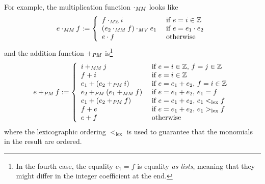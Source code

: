 \documentclass[runningheads]{llncs}
\newcommand{\Z}{{\mathbb Z}}
\begin{document}
For example, the multiplication function $\cdot_{\it MM}$ looks like
\[
e\cdot_{\it MM}f := \left\{
\begin{array}{ll}
 f\cdot_{\it M\Z}i & \mbox{ if $e=i\in\Z$}\\
 (e_2\cdot_{\it MM}f)\cdot_{\it MV}e_1 & \mbox{ if $e=e_1\cdot e_2$}\\
 e\cdot f & \mbox{ otherwise}
\end{array}\right.
\]
\noindent and the addition function $+_{\it PM}$ is\footnote{In the fourth
case, the equality $e_1=f$ is equality \emph{as lists}, meaning that
they might differ in the integer coefficient at the end.}
\[
e+_{\it PM}f := \left\{
\begin{array}{ll}
 i+_{\it MM} j & \mbox{ if $e=i\in\Z$, $f=j\in\Z$} \\
 f+i & \mbox{ if $e=i\in\Z$} \\
 e_1+(e_2+_{\it PM} i) & \mbox{ if $e=e_1+e_2$, $f=i\in\Z$} \\
 e_2+_{\it PM}(e_1+_{\it MM} f) & \mbox{ if $e=e_1+e_2$, $e_1=f$} \\
 e_1+(e_2+_{\it PM} f) & \mbox{ if $e=e_1+e_2$, $e_1<_{\mathrm{lex}}f$} \\
 f+e & \mbox{ if $e=e_1+e_2$, $e_1>_{\mathrm{lex}}f$} \\
 e+f & \mbox{ otherwise}
\end{array}\right.
\]
\noindent where the lexicographic ordering $<_{\mathrm{lex}}$ is
used to guarantee that the monomials in the result are ordered.
\end{document}
